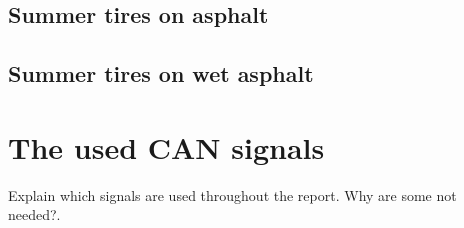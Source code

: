 \subsection{Summer tires on asphalt}

\subsection{Summer tires on wet asphalt}

\section{The used CAN signals}
Explain which signals are used throughout the report. Why are some not needed?.
